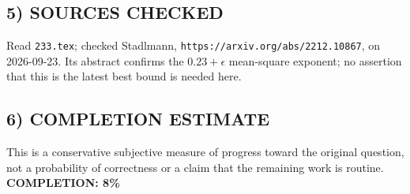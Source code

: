 \subsection{5) SOURCES CHECKED}
Read \texttt{233.tex}; checked Stadlmann, \texttt{https://arxiv.org/abs/2212.10867}, on 2026-09-23. Its abstract confirms the $0.23+\epsilon$ mean-square exponent; no assertion that this is the latest best bound is needed here.
\subsection{6) COMPLETION ESTIMATE}
This is a conservative subjective measure of progress toward the original question, not a probability of correctness or a claim that the remaining work is routine.
\textbf{COMPLETION: 8\%}
